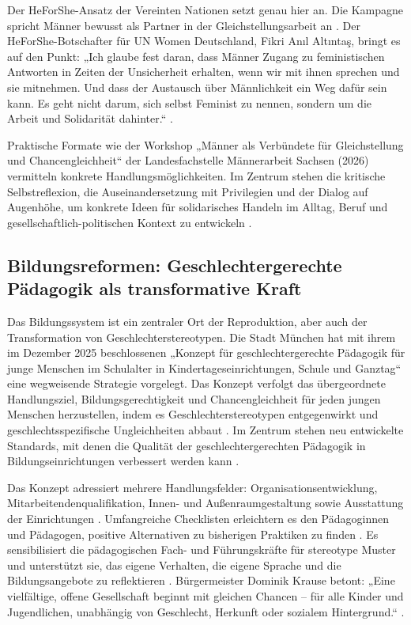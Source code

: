 \documentclass[12pt,a4paper]{article}
\begin{document}
	Der HeForShe-Ansatz der Vereinten Nationen setzt genau hier an. Die Kampagne spricht Männer bewusst als Partner in der Gleichstellungsarbeit an \cite{bundesforum_gewalt}. Der HeForShe-Botschafter für UN Women Deutschland, Fikri Anıl Altıntaş, bringt es auf den Punkt: „Ich glaube fest daran, dass Männer Zugang zu feministischen Antworten in Zeiten der Unsicherheit erhalten, wenn wir mit ihnen sprechen und sie mitnehmen. Und dass der Austausch über Männlichkeit ein Weg dafür sein kann. Es geht nicht darum, sich selbst Feminist zu nennen, sondern um die Arbeit und Solidarität dahinter.“ \cite{heforshe_doku}.
	
	Praktische Formate wie der Workshop „Männer als Verbündete für Gleichstellung und Chancengleichheit“ der Landesfachstelle Männerarbeit Sachsen (2026) vermitteln konkrete Handlungsmöglichkeiten. Im Zentrum stehen die kritische Selbstreflexion, die Auseinandersetzung mit Privilegien und der Dialog auf Augenhöhe, um konkrete Ideen für solidarisches Handeln im Alltag, Beruf und gesellschaftlich-politischen Kontext zu entwickeln \cite{maenner_als_verbuendete_workshop}.
	
	\subsection{Bildungsreformen: Geschlechtergerechte Pädagogik als transformative Kraft}
	
	Das Bildungssystem ist ein zentraler Ort der Reproduktion, aber auch der Transformation von Geschlechterstereotypen. Die Stadt München hat mit ihrem im Dezember 2025 beschlossenen „Konzept für geschlechtergerechte Pädagogik für junge Menschen im Schulalter in Kindertageseinrichtungen, Schule und Ganztag“ eine wegweisende Strategie vorgelegt. Das Konzept verfolgt das übergeordnete Handlungsziel, Bildungsgerechtigkeit und Chancengleichheit für jeden jungen Menschen herzustellen, indem es Geschlechterstereotypen entgegenwirkt und geschlechtsspezifische Ungleichheiten abbaut \cite{muenchen_konzept_pm}. Im Zentrum stehen neu entwickelte Standards, mit denen die Qualität der geschlechtergerechten Pädagogik in Bildungseinrichtungen verbessert werden kann \cite{muenchen_konzept_pm}.
	
	Das Konzept adressiert mehrere Handlungsfelder: Organisationsentwicklung, Mitarbeitendenqualifikation, Innen- und Außenraumgestaltung sowie Ausstattung der Einrichtungen \cite{muenchen_konzept_pm}. Umfangreiche Checklisten erleichtern es den Pädagoginnen und Pädagogen, positive Alternativen zu bisherigen Praktiken zu finden \cite{muenchen_konzept_pm}. Es sensibilisiert die pädagogischen Fach- und Führungskräfte für stereotype Muster und unterstützt sie, das eigene Verhalten, die eigene Sprache und die Bildungsangebote zu reflektieren \cite{muenchen_konzept_artikel}. Bürgermeister Dominik Krause betont: „Eine vielfältige, offene Gesellschaft beginnt mit gleichen Chancen – für alle Kinder und Jugendlichen, unabhängig von Geschlecht, Herkunft oder sozialem Hintergrund.“ \cite{muenchen_konzept_artikel}.
	
\end{document}
